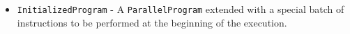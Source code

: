 \begin{itemize}
    \item \verb|InitializedProgram| - A \verb|ParallelProgram| extended with a special batch of instructions to be performed at the beginning of the execution.
    \begin{code}
        \>[2]\AgdaSpace{}%
        \AgdaSymbol{:}\AgdaSpace{}%
        \<%
        \\
        \>[2]\AgdaSpace{}%
        \AgdaSymbol{=}\AgdaSpace{}%
        \AgdaSymbol{(}\AgdaSpace{}%
        \AgdaSpace{}%
        \AgdaSymbol{)}\<%
    \end{code}
    
\end{itemize}


